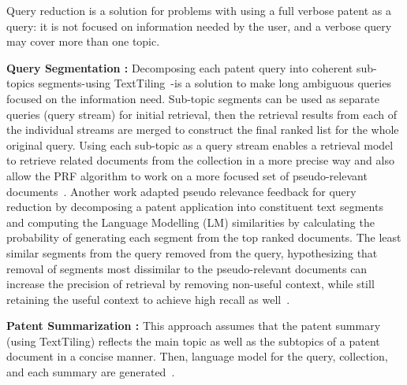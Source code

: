 Query reduction is a solution for problems with using a full verbose patent as a query: it is not focused on information needed by the user, and a verbose query may cover more than one topic.

\begin{list}{-}{}

\item \textbf{Query Segmentation :} Decomposing each patent query into coherent sub-topics segments-using TextTiling~\citep{hearst1997texttiling}-is a solution to make long ambiguous queries focused on the information need. Sub-topic segments can be used as separate queries (query stream) for initial retrieval, then the retrieval results from each of the individual streams are merged to construct the final ranked list for the whole original query. Using each sub-topic as a query stream enables a retrieval model to retrieve related documents from the collection in a more precise way and also allow the PRF algorithm to work on a more focused set of pseudo-relevant documents~\citep{takaki2004associative, ganguly2011united}. Another work adapted pseudo relevance feedback for query reduction by decomposing a patent application into constituent text segments and computing the Language Modelling (LM) similarities by calculating the probability of generating each segment from the top ranked documents. The least similar segments from the query removed from the query, hypothesizing that removal of segments most dissimilar to the pseudo-relevant documents can increase the precision of retrieval by removing non-useful context, while still retaining the useful context to achieve high recall as well~\citep{ganguly2011patent}.

\item \textbf{Patent Summarization :} This approach assumes that the patent summary (using TextTiling) reflects the main topic as well as the subtopics of a patent document in a concise manner. Then, language model for the query, collection, and each summary are generated~\citep{mahdabi2011report}. 

\end{list}

